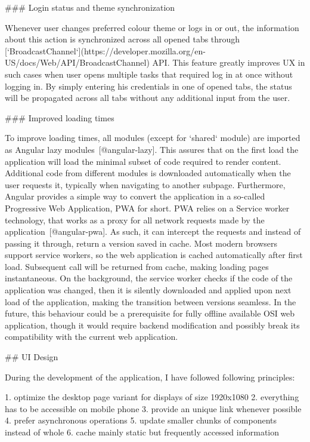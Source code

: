 \documentclass[
  digital, %
  oneside, %
  lof,     %
  lot,     %
]{fithesis4}
\begin{document}
{### Login status and theme synchronization

Whenever user changes preferred colour theme or logs in or out, the information about this action is synchronized across all opened tabs through [`BroadcastChannel`](https://developer.mozilla.org/en-US/docs/Web/API/BroadcastChannel) API. This feature greatly improves UX in such cases when user opens multiple tasks that required log in at once without logging in. By simply entering his credentials in one of opened tabs, the status will be propagated across all tabs without any additional input from the user.

### Improved loading times
\label{chap:faster}

To improve loading times, all modules (except for `shared` module) are imported as Angular lazy modules~[@angular-lazy]. This assures that on the first load the application will load the minimal subset of code required to render content. Additional code from different modules is downloaded automatically when the user requests it, typically when navigating to another subpage. Furthermore, Angular provides a simple way to convert the application in a so-called Progressive Web Application, PWA for short. PWA relies on a Service worker technology, that works as a proxy for all network requests made by the application~[@angular-pwa]. As such, it can intercept the requests and instead of passing it through, return a version saved in cache. Most modern browsers support service workers, so the web application is cached automatically after first load. Subsequent call will be returned from cache, making loading pages instantaneous. On the background, the service worker checks if the code of the application was changed, then it is silently downloaded and applied upon next load of the application, making the transition between versions seamless. In the future, this behaviour could be a prerequisite for fully offline available OSI web application, though it would require backend modification and possibly break its compatibility with the current web application.

## UI Design

During the development of the application, I have followed following principles:

1. optimize the desktop page variant for displays of size 1920x1080
2. everything has to be accessible on mobile phone
3. provide an unique link whenever possible
4. prefer asynchronous operations
5. update smaller chunks of components instead of whole
6. cache mainly static but frequently accessed information

}
\end{document}
